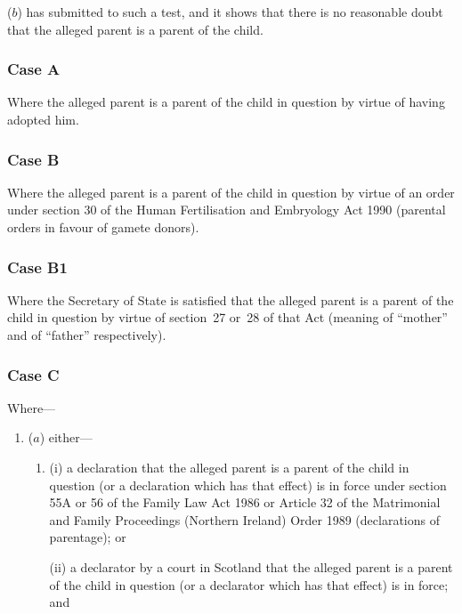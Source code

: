 \documentclass[12pt,a4paper]{article}
\begin{document}
\begin{enumerate}
\begin{enumerate}
($b$) has submitted to such a test, and it shows that there is no reasonable doubt that the alleged parent is a parent of the child.
\end{enumerate}

    \subsubsection*{Case A}

    Where the alleged parent is a parent of the child in question by virtue of having adopted him.

    \subsubsection*{Case B}

    Where the alleged parent is a parent of the child in question by virtue of an order under section 30 of the Human Fertilisation and Embryology Act 1990 (parental orders in favour of gamete donors).

\subsubsection*{Case B1}

Where the Secretary of State is satisfied that the alleged parent is a parent of the child in question by virtue of section~27 or~28 of that Act (meaning of “mother” and of “father” respectively).

    \subsubsection*{Case C}

    Where—
\begin{enumerate}\item[]
    ($a$) 
    either—
\begin{enumerate}\item[]
    (i) 
    a declaration that the alleged parent is a parent of the child in question (or a declaration which has that effect) is in force under section 
55A or  %
56 of the Family Law Act 1986 
or Article 32 of the Matrimonial and Family Proceedings (Northern Ireland) Order 1989  %
(declarations of parentage); or

    (ii) 
    a declarator by a court in Scotland that the alleged parent is a parent of the child in question (or a declarator which has that effect) is in force; and
\end{enumerate}


\end{enumerate}
\end{enumerate}
\end{document}
